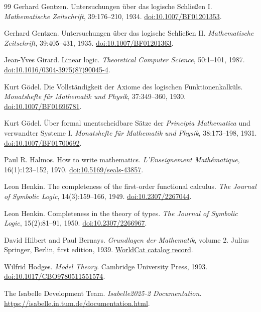 \documentclass[11pt,oneside,openany]{book}
\theoremstyle{definition}
\theoremstyle{plain}
\theoremstyle{remark}
\begin{document}
\begin{thebibliography}{99}
Gerhard Gentzen.
Untersuchungen \"uber das logische Schlie\ss en I.
\emph{Mathematische Zeitschrift}, 39:176--210, 1934.
\href{https://doi.org/10.1007/BF01201353}{doi:10.1007/BF01201353}.

Gerhard Gentzen.
Untersuchungen \"uber das logische Schlie\ss en II.
\emph{Mathematische Zeitschrift}, 39:405--431, 1935.
\href{https://doi.org/10.1007/BF01201363}{doi:10.1007/BF01201363}.

Jean-Yves Girard.
Linear logic.
\emph{Theoretical Computer Science}, 50:1--101, 1987.
\href{https://doi.org/10.1016/0304-3975(87)90045-4}{doi:10.1016/0304-3975(87)90045-4}.

Kurt G\"odel.
Die Vollst\"andigkeit der Axiome des logischen Funktionenkalk\"uls.
\emph{Monatshefte f\"ur Mathematik und Physik}, 37:349--360, 1930.
\href{https://doi.org/10.1007/BF01696781}{doi:10.1007/BF01696781}.

Kurt G\"odel.
\"Uber formal unentscheidbare S\"atze der \emph{Principia Mathematica} und
verwandter Systeme I.
\emph{Monatshefte f\"ur Mathematik und Physik}, 38:173--198, 1931.
\href{https://doi.org/10.1007/BF01700692}{doi:10.1007/BF01700692}.

Paul R. Halmos.
How to write mathematics.
\emph{L'Enseignement Math\'ematique}, 16(1):123--152, 1970.
\href{https://doi.org/10.5169/seals-43857}{doi:10.5169/seals-43857}.

Leon Henkin.
The completeness of the first-order functional calculus.
\emph{The Journal of Symbolic Logic}, 14(3):159--166, 1949.
\href{https://doi.org/10.2307/2267044}{doi:10.2307/2267044}.

Leon Henkin.
Completeness in the theory of types.
\emph{The Journal of Symbolic Logic}, 15(2):81--91, 1950.
\href{https://doi.org/10.2307/2266967}{doi:10.2307/2266967}.

David Hilbert and Paul Bernays.
\emph{Grundlagen der Mathematik}, volume 2.
Julius Springer, Berlin, first edition, 1939.
\href{https://search.worldcat.org/title/Grundlagen-der-Mathematik.-Bd.-2/oclc/1424451730}{WorldCat catalog record}.

Wilfrid Hodges.
\emph{Model Theory}.
Cambridge University Press, 1993.
\href{https://doi.org/10.1017/CBO9780511551574}{doi:10.1017/CBO9780511551574}.

The Isabelle Development Team.
\emph{Isabelle2025-2 Documentation}.
\url{https://isabelle.in.tum.de/documentation.html}.


\end{thebibliography}
\end{document}
